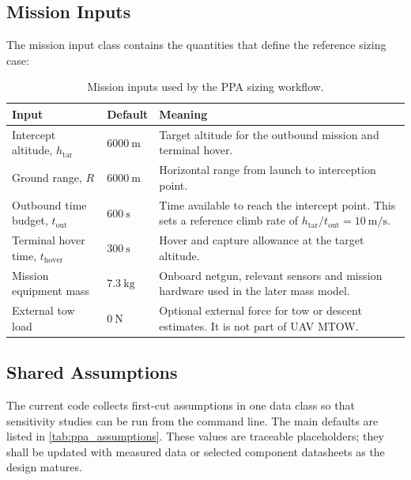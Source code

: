 \subsection{Mission Inputs}
\label{subsec:ppa_mission_inputs}

The mission input class contains the quantities that define the reference sizing case:

\begin{table}[H]
\centering
\small
\caption{Mission inputs used by the PPA sizing workflow.}
\label{tab:ppa_mission_inputs}
\begin{tabularx}{\textwidth}{@{}p{}p{}X@{}}
\toprule
\textbf{Input} & \textbf{Default} & \textbf{Meaning} \\
\midrule
Intercept altitude, \(h_{\mathrm{tar}}\) & \(6000~\mathrm{m}\) & Target altitude for the outbound mission and terminal hover. \\
Ground range, \(R\) & \(6000~\mathrm{m}\) & Horizontal range from launch to interception point. \\
Outbound time budget, \(t_{\mathrm{out}}\) & \(600~\mathrm{s}\) & Time available to reach the intercept point. This sets a reference climb rate of \(h_{\mathrm{tar}}/t_{\mathrm{out}}=10~\mathrm{m/s}\). \\
Terminal hover time, \(t_{\mathrm{hover}}\) & \(300~\mathrm{s}\) & Hover and capture allowance at the target altitude. \\
Mission equipment mass & \(7.3~\mathrm{kg}\) & Onboard netgun, relevant sensors and mission hardware used in the later mass model. \\
External tow load & \(0~\mathrm{N}\) & Optional external force for tow or descent estimates. It is not part of UAV MTOW. \\
\bottomrule
\end{tabularx}
\end{table}

\subsection{Shared Assumptions}
\label{subsec:ppa_shared_assumptions}

The current code collects first-cut assumptions in one data class so that sensitivity studies can be run from the command line. The main defaults are listed in \autoref{tab:ppa_assumptions}. These values are traceable placeholders; they shall be updated with measured data or selected component datasheets as the design matures.

